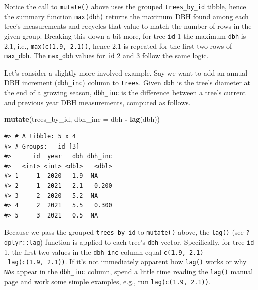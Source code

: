 \documentclass[
  11pt,
]{krantz}
\newenvironment{Shaded}{\begin{snugshade}}{\end{snugshade}}
\newcommand{\DataTypeTok}[1]{\textcolor[rgb]{0.13,0.29,0.53}{#1}}
\newcommand{\KeywordTok}[1]{\textcolor[rgb]{0.13,0.29,0.53}{\textbf{#1}}}
\newcommand{\NormalTok}[1]{#1}
\newcommand{\OperatorTok}[1]{\textcolor[rgb]{0.81,0.36,0.00}{\textbf{#1}}}
\newcommand{\StringTok}[1]{\textcolor[rgb]{0.31,0.60,0.02}{#1}}
\theoremstyle{definition}
\theoremstyle{definition}
\theoremstyle{definition}
\theoremstyle{definition}
\theoremstyle{remark}
\begin{document}
Notice the call to \texttt{mutate()} above uses the grouped \texttt{trees\_by\_id} tibble, hence the summary function \texttt{max(dbh)} returns the maximum DBH found among each tree's measurements and recycles that value to match the number of rows in the given group. Breaking this down a bit more, for tree \texttt{id} 1 the maximum \texttt{dbh} is 2.1, i.e., \texttt{max(c(1.9,\ 2.1))}, hence 2.1 is repeated for the first two rows of \texttt{max\_dbh}. The \texttt{max\_dbh} values for \texttt{id} 2 and 3 follow the same logic.

Let's consider a slightly more involved example. Say we want to add an annual DBH increment (\texttt{dbh\_inc}) column to \texttt{trees}. Given \texttt{dbh} is the tree's diameter at the end of a growing season, \texttt{dbh\_inc} is the difference between a tree's current and previous year DBH measurements, computed as follows.

\begin{Shaded}
\begin{Highlighting}[]
\KeywordTok{mutate}\NormalTok{(trees\_by\_id, }\DataTypeTok{dbh\_inc =}\NormalTok{ dbh }\OperatorTok{{-}}\StringTok{ }\KeywordTok{lag}\NormalTok{(dbh))}
\end{Highlighting}
\end{Shaded}

\begin{verbatim}
#> # A tibble: 5 x 4
#> # Groups:   id [3]
#>      id  year   dbh dbh_inc
#>   <int> <int> <dbl>   <dbl>
#> 1     1  2020   1.9  NA    
#> 2     1  2021   2.1   0.200
#> 3     2  2020   5.2  NA    
#> 4     2  2021   5.5   0.300
#> 5     3  2021   0.5  NA
\end{verbatim}

Because we pass the grouped \texttt{trees\_by\_id} to \texttt{mutate()} above, the \texttt{lag()} (see \texttt{?dplyr::lag}) function is applied to each tree's \texttt{dbh} vector. Specifically, for tree \texttt{id} 1, the first two values in the \texttt{dbh\_inc} column equal \texttt{c(1.9,\ 2.1)\ -\ lag(c(1.9,\ 2.1))}. If it's not immediately apparent how \texttt{lag()} works or why \texttt{NA}s appear in the \texttt{dbh\_inc} column, spend a little time reading the \texttt{lag()} manual page and work some simple examples, e.g., run \texttt{lag(c(1.9,\ 2.1))}.
\end{document}
